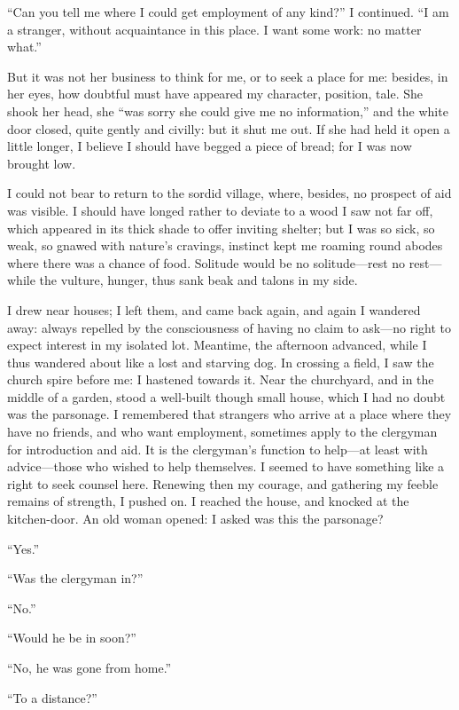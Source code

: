 \enquote{Can you tell me where I could get employment of any kind?} I
continued. \enquote{I am a stranger, without acquaintance in this
	place. I want some work: no matter what.}

But it was not her business to think for me, or to seek a place for me:
besides, in her eyes, how doubtful must have appeared my character,
position, tale. She shook her head, she \enquote{was sorry she could
	give me no information,} and the white door closed, quite gently and
civilly: but it shut me out. If she had held it open a little longer, I
believe I should have begged a piece of bread; for I was now brought
low.

I could not bear to return to the sordid village, where, besides, no
prospect of aid was visible. I should have longed rather to deviate to
a wood I saw not far off, which appeared in its thick shade to offer
inviting shelter; but I was so sick, so weak, so gnawed with nature's
cravings, instinct kept me roaming round abodes where there was a chance
of food. Solitude would be no solitude---rest no rest---while the
vulture, hunger, thus sank beak and talons in my side.

I drew near houses; I left them, and came back again, and again I
wandered away: always repelled by the consciousness of having no claim
to ask---no right to expect interest in my isolated lot. Meantime, the
afternoon advanced, while I thus wandered about like a lost and starving
dog. In crossing a field, I saw the church spire before me: I hastened
towards it. Near the churchyard, and in the middle of a garden, stood a
well-built though small house, which I had no doubt was the parsonage.
I remembered that strangers who arrive at a place where they have no
friends, and who want employment, sometimes apply to the clergyman for
introduction and aid. It is the clergyman's function to help---at least
with advice---those who wished to help themselves. I seemed to have
something like a right to seek counsel here. Renewing then my courage,
and gathering my feeble remains of strength, I pushed on. I reached the
house, and knocked at the kitchen-door. An old woman opened: I asked
was this the parsonage?

\enquote{Yes.}

\enquote{Was the clergyman in?}

\enquote{No.}

\enquote{Would he be in soon?}

\enquote{No, he was gone from home.}

\enquote{To a distance?}

